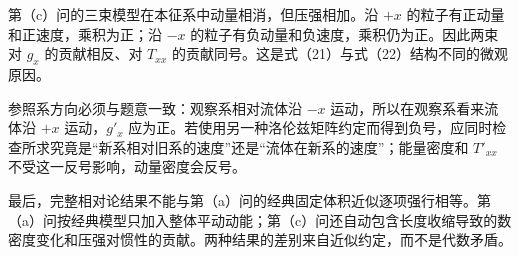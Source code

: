 \documentclass[12pt,a4paper,UTF8]{ctexart}
\begin{document}
第（c）问的三束模型在本征系中动量相消，但压强相加。沿 \(+x\)
的粒子有正动量和正速度，乘积为正；沿 \(-x\)
的粒子有负动量和负速度，乘积仍为正。因此两束对 \(g_x\) 的贡献相反、对
\(T_{xx}\) 的贡献同号。这是式（21）与式（22）结构不同的微观原因。

参照系方向必须与题意一致：观察系相对流体沿 \(-x\)
运动，所以在观察系看来流体沿 \(+x\) 运动，\(g'_x\)
应为正。若使用另一种洛伦兹矩阵约定而得到负号，应同时检查所求究竟是``新系相对旧系的速度''还是``流体在新系的速度''；能量密度和
\(T'_{xx}\) 不受这一反号影响，动量密度会反号。

最后，完整相对论结果不能与第（a）问的经典固定体积近似逐项强行相等。第（a）问按经典模型只加入整体平动动能；第（c）问还自动包含长度收缩导致的数密度变化和压强对惯性的贡献。两种结果的差别来自近似约定，而不是代数矛盾。
\end{document}

